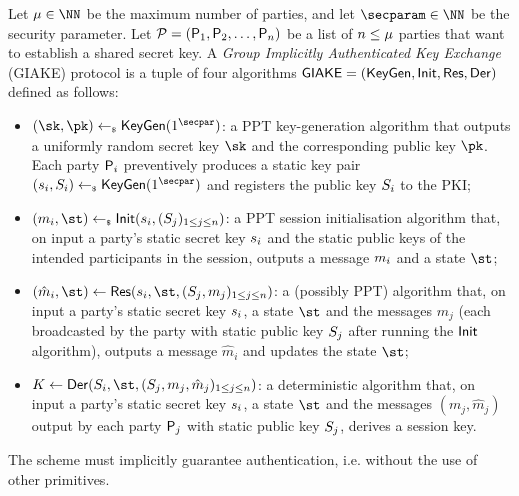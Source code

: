 \begin{plaindef}[GIAKE]\label{def:GKE}
	Let $\projectKey \in \NN$ be the maximum number of parties, and let $\secparam\in \NN$ be the security parameter. 
	Let $\PartySet = (\User[1],\User[2],\dots,\allowbreak \User[n])$ be a list of $n \leq \projectKey$ parties that want to establish a shared secret key.
	A \textit{Group Implicitly Authenticated Key Exchange} (GIAKE) protocol is a tuple of four algorithms $\GIAKE = (\KeyGen, \GAKEIni, \GAKERes, \GAKEDer)$ defined as follows:
	\begin{itemize}
		\item $(\sk,\pk) \getsr \KeyGen(1^\secpar)$: a PPT key-generation algorithm that outputs a uniformly random secret key $\sk$ and the corresponding public key $\pk$.
		Each party $\User[i]$ preventively produces a static key pair $(\ssk_i,\spk_i) \getsr \KeyGen(1^\secpar)$ and registers the public key $\spk_i$ to the PKI;
		\item $(m_i,\st) \getsr \GAKEIni (\ssk_i,(\spk_j)_{1\leq j \leq n})$: a PPT session initialisation algorithm that, on input a party's static secret key $\ssk_i$ and the static public keys of the intended participants in the session, outputs a message $\messageIni$ and a state $\st$;
		\item $(\hat{m}_i,\st) \gets \GAKERes(\ssk_i,\st,(\spk_j,m_j)_{1\leq j \leq n})$: a (possibly PPT) algorithm that, on input a party's static secret key $\ssk_i$, a state $\st$ and the messages $m_j$ (each broadcasted by the party with static public key $\spk_j$ after running the $\GAKEIni$ algorithm), outputs a message $\hat{m}_i$ and updates the state $\st$;
		\item $K \gets \GAKEDer (\spk_i,\st,(\spk_j,m_j,\hat{m}_j)_{1\leq j \leq n})$: a deterministic algorithm that,  on input a party's static secret key $\ssk_i$, a state $\st$ and the messages $(m_j,\hat{m}_j)$ output by each party $\User[j]$ with static public key $\spk_j$, derives a session key.
	\end{itemize}
	The scheme must implicitly guarantee authentication, i.e. without the use of other primitives.
\end{plaindef}	

